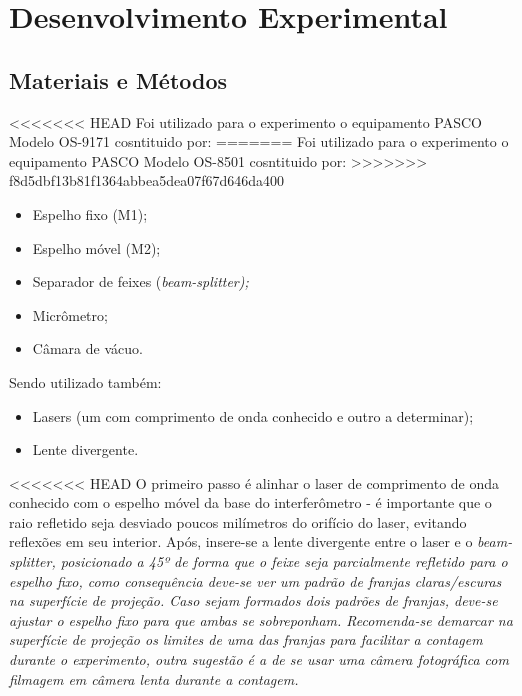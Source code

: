 \section{Desenvolvimento Experimental}
\subsection{Materiais e Métodos}
<<<<<<< HEAD
Foi utilizado para o experimento o equipamento PASCO Modelo OS-9171 cosntituido por: 
=======
Foi utilizado para o experimento o equipamento PASCO Modelo OS-8501 cosntituido por: 
>>>>>>> f8d5dbf13b81f1364abbea5dea07f67d646da400
\begin{itemize}
	\item Espelho fixo (M1);
	\item Espelho móvel (M2);
	\item Separador de feixes (\it{beam-splitter});
	\item Micrômetro;
	\item Câmara de vácuo.
\end{itemize}
Sendo utilizado também:
\begin{itemize}
	\item Lasers (um com comprimento de onda conhecido e outro a determinar);
	\item Lente divergente.
\end{itemize}

<<<<<<< HEAD
    O primeiro passo é alinhar o laser de comprimento de onda conhecido com o espelho móvel da base do interferômetro - é importante que o raio refletido seja desviado poucos milímetros do orifício do laser, evitando reflexões em seu interior. Após, insere-se a lente divergente entre o laser e o \it{beam-splitter}, posicionado a 45º de forma que o feixe seja parcialmente refletido para o espelho fixo, como consequência deve-se ver um padrão de franjas claras/escuras na superfície de projeção. Caso sejam formados dois padrões de franjas, deve-se ajustar o espelho fixo para que ambas se sobreponham. 
    Recomenda-se demarcar na superfície de projeção os limites de uma das franjas para facilitar a contagem durante o experimento, outra sugestão é a de se usar uma câmera fotográfica com filmagem em câmera lenta durante a contagem. 
    

